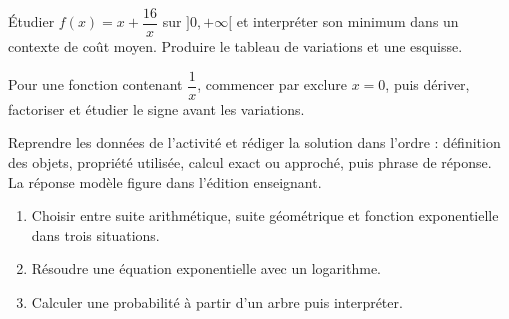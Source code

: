 \begin{activite}
Étudier $f(x)=x+\dfrac{16}{x}$ sur $]0,+\infty[$ et interpréter son minimum dans un contexte de coût moyen. Produire le tableau de variations et une esquisse.
\begin{center}\end{center}
\end{activite}

\begin{traceecrite}Pour une fonction contenant $\dfrac1x$, commencer par exclure $x=0$, puis dériver, factoriser et étudier le signe avant les variations.\end{traceecrite}

\begin{exemple}
Reprendre les données de l'activité et rédiger la solution dans l'ordre : définition des objets, propriété utilisée, calcul exact ou approché, puis phrase de réponse. La réponse modèle figure dans l'édition enseignant.
\end{exemple}

\begin{exercice}[-- essentiel]
\begin{enumerate}\item Choisir entre suite arithmétique, suite géométrique et fonction exponentielle dans trois situations.\item Résoudre une équation exponentielle avec un logarithme.\item Calculer une probabilité à partir d'un arbre puis interpréter.\end{enumerate}
\end{exercice}


